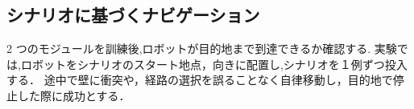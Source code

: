 \subsection{シナリオに基づくナビゲーション}
2 つのモジュールを訓練後,ロボットが目的地まで到達できるか確認する.
実験では,ロボットをシナリオのスタート地点，向きに配置し,シナリオを１例ずつ投入する．
途中で壁に衝突や，経路の選択を誤ることなく自律移動し，目的地で停止した際に成功とする．